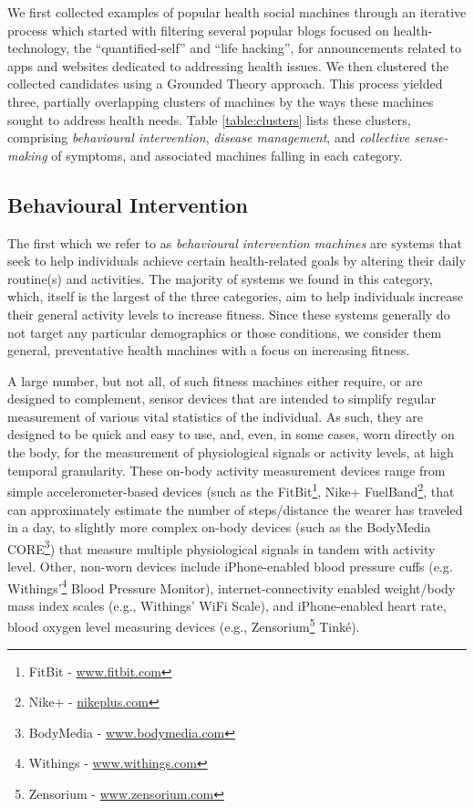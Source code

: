 \documentclass{sig-alternate}
\begin{document}
We first collected examples of popular health social machines through
an iterative process which started with filtering several popular blogs
focused on health-technology, the ``quantified-self'' and ``life
hacking'', for announcements related to apps and websites dedicated to
addressing health issues. We then clustered the collected candidates
using a Grounded Theory approach.  This process yielded three,
partially overlapping clusters of machines by the ways these machines
sought to address health needs.  Table \ref{table:clusters} lists these
clusters, comprising \emph{behavioural intervention}, \emph{disease
  management}, and \emph{collective sense-making} of symptoms, and
associated machines falling in each category.

\subsection{Behavioural Intervention}

The first which we refer to as \emph{behavioural intervention
  machines} are systems that seek to help individuals achieve certain
health-related goals by altering their daily routine(s) and
activities.  The majority of systems we found in this category, which,
itself is the largest of the three categories, aim to help individuals
increase their general activity levels to increase fitness.  Since
these systems generally do not target any particular demographics or
those conditions, we consider them general, preventative health
machines with a focus on increasing fitness.

A large number, but not all, of such fitness machines either require,
or are designed to complement, sensor devices that are intended to
simplify regular measurement of various vital statistics of the
individual.  As such, they are designed to be quick and easy to use,
and, even, in some cases, worn directly on the body, for the
measurement of physiological signals or activity levels, at high
temporal granularity. These on-body activity measurement devices range
from simple accelerometer-based devices (such as the
FitBit\footnote{FitBit - \url{www.fitbit.com}}, Nike+ FuelBand\footnote{Nike+ -
  \url{nikeplus.com}}, that can approximately estimate the number of
steps/distance the wearer has traveled in a day, to slightly more
complex on-body devices (such as the BodyMedia CORE\footnote{BodyMedia
  - \url{www.bodymedia.com}}) that measure multiple physiological
signals in tandem with activity level.  Other, non-worn devices
include iPhone-enabled blood pressure cuffs
(e.g. Withings'\footnote{Withings - \url{www.withings.com}} Blood
Pressure Monitor), internet-connectivity enabled weight/body mass
index scales (e.g., Withings' WiFi Scale), and iPhone-enabled heart
rate, blood oxygen level measuring devices (e.g.,
Zensorium\footnote{Zensorium - \url{www.zensorium.com}} Tink\'{e}).
\end{document}
